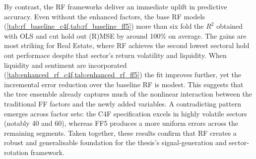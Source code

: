 By contrast, the RF frameworks deliver an immediate uplift in predictive accuracy. Even without the enhanced factors, the base RF models (\cref{tab:rf_baseline_c4f,tab:rf_baseline_ff5}) more than six fold the $R^{2}$ obtained with OLS and cut hold out (R)MSE by around 100\% on average. The gains are most striking for Real Estate, where RF achieves the second lowest sectoral hold out performace despite that sector's return volatility and liquidity. When liquidity and sentiment are incorporated (\cref{tab:enhanced_rf_c4f,tab:enhanced_rf_ff5}) the fit improves further, yet the incremental error reduction over the baseline RF is modest. This suggests that the tree ensemble already captures much of the nonlinear interaction between the traditional FF factors and the newly added variables. A contradicting pattern emerges across factor sets: the C4F specification excels in highly volatile sectors (notably 40 and 60), whereas FF5 produces a more uniform errors across the remaining segments. Taken together, these results confirm that RF creates a robust and generalisable foundation for the thesis's signal-generation and sector-rotation framework.





